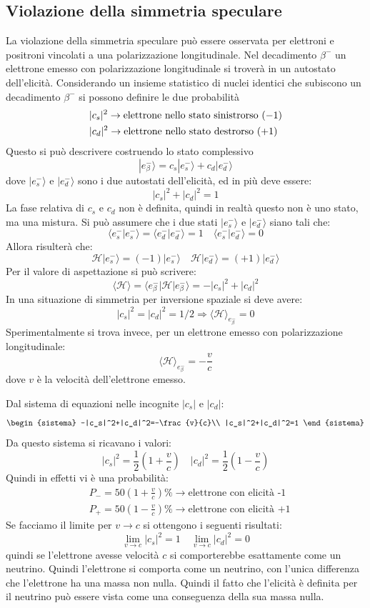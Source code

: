 \subsection{Violazione della simmetria speculare}
La violazione della simmetria speculare può essere osservata per elettroni e positroni vincolati a una polarizzazione longitudinale.
Nel decadimento $\beta^-$ un elettrone emesso con polarizzazione longitudinale si troverà in un autostato dell'elicità. Considerando un insieme statistico
di nuclei identici che subiscono un decadimento $\beta^-$ si possono definire le due probabilità
\begin{align*}
&|c_s|^2\rightarrow\textup{elettrone nello stato sinistrorso } (-1)\\
&|c_d|^2\rightarrow\textup{elettrone nello stato destrorso } (+1)
\end{align*}
Questo si può descrivere costruendo lo stato complessivo
\[
|e_{\beta}^-\rangle=c_s|e_s^-\rangle+c_d|e_d^-\rangle
\]
dove $|e_s^-\rangle$ e $|e_d^-\rangle$ sono i due autostati dell'elicità, ed in più deve essere:
\[
|c_s|^2+|c_d|^2=1
\]
La fase relativa di $c_s$ e $c_d$ non è definita, quindi in realtà questo non è uno stato, ma una mistura. Si può assumere che i due stati $|e_s^-\rangle$ e $|e_d^-\rangle$
siano tali che:
\[
\langle e_s^-|e_s^-\rangle=\langle e_d^-|e_d^-\rangle=1\quad \langle e_s^-|e_d^-\rangle=0
\]
Allora risulterà che:
\[
\mathcal{H}|e_s^-\rangle=(-1)|e_s^-\rangle\quad\mathcal{H}|e_d^-\rangle=(+1)|e_d^-\rangle
\]
Per il valore di aspettazione si può scrivere:
\[
\langle\mathcal{H}\rangle=\langle e_{\beta}^-|\mathcal{H}|e_{\beta}^-\rangle=-|c_s|^2+|c_d|^2
\]
In una situazione di simmetria per inversione spaziale si deve avere:
\[
|c_s|^2=|c_d|^2=1/2\Rightarrow\langle\mathcal{H}\rangle_{e_{\beta}^-}=0
\]
Sperimentalmente si trova invece, per un elettrone emesso con polarizzazione longitudinale:
\[
\langle\mathcal{H}\rangle_{e_{\beta}^-}=-\frac{v}{c}
\]
dove $v$ è la velocità dell'elettrone emesso.

Dal sistema di equazioni nelle incognite $|c_s|$ e $|c_d|$:
\[
\begin{sistema}
-|c_s|^2+|c_d|^2=-\frac{v}{c}\\
|c_s|^2+|c_d|^2=1
\end{sistema}
\]
Da questo sistema si ricavano i valori:
\[
|c_s|^2=\frac{1}{2}(1+\frac{v}{c})\quad|c_d|^2=\frac{1}{2}(1-\frac{v}{c})
\]
Quindi in effetti vi è una probabilità:
\begin{align*}
&P_-=50(1+\frac{v}{c})\%\rightarrow\text{elettrone con elicità -1}\\
&P_+=50(1-\frac{v}{c})\%\rightarrow\text{elettrone con elicità +1}
\end{align*}
Se facciamo il limite per $v\rightarrow c$ si ottengono i seguenti risultati:
\[
\lim_{v\rightarrow c}|c_s|^2=1\quad\lim_{v\rightarrow c}|c_d|^2=0
\]
quindi se l'elettrone avesse velocità $c$ si comporterebbe esattamente come un neutrino. Quindi l'elettrone si comporta come un neutrino, con l'unica differenza
che l'elettrone ha una massa non nulla. Quindi il fatto che l'elicità è definita per il neutrino può essere vista come una conseguenza della sua massa nulla.

